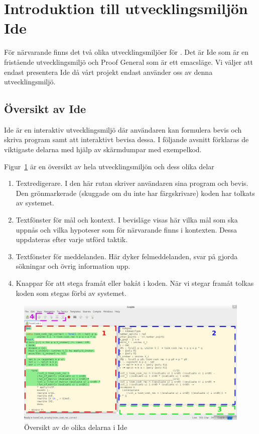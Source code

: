 \section{Introduktion till utvecklingsmiljön \coq Ide}

För närvarande finns det två olika utvecklingsmiljöer för \coq. Det är \coq Ide
som är en fristående utvecklingsmiljö och Proof General som är ett emacsläge.
Vi väljer att endast presentera \coq Ide då vårt projekt endast använder oss av
denna utvecklingsmiljö.

\subsection{Översikt av \coq Ide}

\coq Ide är en interaktiv utvecklingsmiljö där användaren kan formulera bevis
och skriva program samt att interaktivt bevisa dessa. I följande avsnitt
förklaras de viktigaste delarna med hjälp av skärmdumpar med exempelkod.

Figur~\ref{fig:oversikt} är en översikt av hela utvecklingsmiljön och dess
olika delar
\begin{enumerate}
\item Textredigerare. I den här rutan skriver användaren sina program och
  bevis. Den grönmarkerade (skuggade om du inte har färgskrivare) koden har
  tolkats av systemet.
\item Textfönster för mål och kontext. I bevisläge visas här vilka mål som ska
  uppnås och vilka hypoteser som för närvarande finns i kontexten. Dessa
  uppdateras efter varje utförd taktik.
\item Textfönster för meddelanden. Här dyker felmeddelanden, svar på
  gjorda sökningar och övrig information upp.
\item Knappar för att stega framåt eller bakåt i koden. När vi stegar framåt
  tolkas koden som stegas förbi av systemet.
\end{enumerate}

\filbreak

\begin{figure}[H]
  \centering
  \includegraphics[width=\textwidth]{images/Overview}
  \caption[Översikt av \coq Ide]
   {Översikt av de olika delarna i \coq Ide}
  \label{fig:oversikt}
\end{figure}

